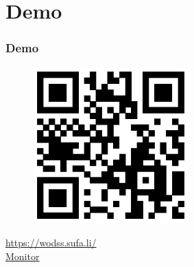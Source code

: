 \section{Demo}
\begin{frame}
    \frametitle{Demo}
    \begin{center}
        \begin{figure}
            \includegraphics[height=6cm]{media/qr-wodss-sufa-li.eps}
        \end{figure}
        \url{https://wodss.sufa.li/}\\
        \href{https://wodss.sufa.li/monitor.html\#eyJ1cmwiOiJ3c3M6Ly93b2Rzcy5zdWZhLmxpOjQ0My93cyIsInVzZXJuYW1lIjoibW9uaXRvciIsInBhc3N3b3JkIjoiUDRxckZpZXMwSEI5U1JkWnZURGl3bTZXWGN4SlVKczMifQ==}{Monitor}
    \end{center}
\end{frame}
